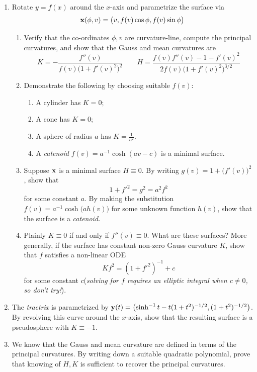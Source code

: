 \begin{exercises}{}{}
\begin{enumerate}
	\goodbreak


	\item\label{exs:curvlinerotation} Rotate $y=f(x)$ around the $x$-axis and parametrize the surface via
	\[
		{\mathbf{x}}(\phi,v)=\bigl(v,f(v)\cos\phi,f(v)\sin\phi\bigr)
	\]
	\begin{enumerate}
	  \item Verify that the co-ordinates $\phi,v$ are curvature-line, compute the principal curvatures, and show that the Gauss and mean curvatures are
		\[
			K=-\frac{f''(v)}{f(v)\bigl(1+f'(v)^2\bigr)^2}\qquad H=\frac{f(v)f''(v)-1-f'(v)^2}{2f(v)\bigl(1+f'(v)^2\bigr)^{3/2}}
		\]
		\item Demonstrate the following by choosing suitable $f(v)$:
		\begin{enumerate}
		  \item A cylinder has $K=0$;
		  \item A cone has $K=0$;
		  \item A sphere of radius $a$ has $K=\frac 1{a^2}$.
		  \item A \emph{catenoid} $f(v)=a^{-1}\cosh(av-c)$ is a minimal surface.
		\end{enumerate}

	  \item Suppose ${\mathbf{x}}$ is a minimal surface $H\equiv 0$. By writing $g(v)=1+\bigl(f'(v)\bigr)^2$, show that
	  \[
	  	1+f'^2=g^2=a^2f^2
	  \]
	  for some constant $a$. By making the substitution $f(v)=a^{-1}\cosh\bigl(ah(v)\bigr)$ for some unknown function $h(v)$, show that the surface is a \emph{catenoid.}
	  
	  \item Plainly $K\equiv 0$ if and only if $f''(v)\equiv 0$. What are these surfaces? More generally, if the surface has constant non-zero Gauss curvature $K$, show that $f$ satisfies a non-linear ODE
	  \[
	  	Kf^2=(1+f'^2)^{-1}+c
	  \]
	  for some constant $c$\quad (\emph{solving for $f$ requires an elliptic integral when $c\neq 0$, so don't try!}).
	\end{enumerate}
	
	
	\item The \emph{tractrix} is parametrized by ${\mathbf{y}}(t)=\bigl(\sinh^{-1}t-t(1+t^2)^{-1/2}, (1+t^2)^{-1/2}\bigr)$. By revolving this curve around the $x$-axis, show that the resulting surface is a pseudosphere with $K\equiv -1$.
	
	
  \item We know that the Gauss and mean curvature are defined in terms of the principal curvatures. By writing down a suitable quadratic polynomial, prove that knowing of $H,K$ is sufficient to recover the principal curvatures.
	

\end{enumerate}
\end{exercises}
